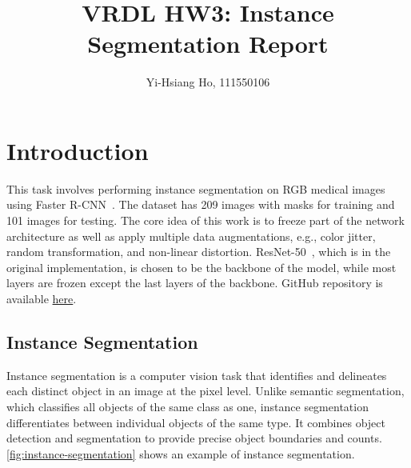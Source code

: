 \documentclass[10pt,twocolumn,letterpaper]{article}
\begin{document}
\title{VRDL HW3: Instance Segmentation Report}

\author{Yi-Hsiang Ho, 111550106
}
\maketitle



\section{Introduction}
\label{sec:intro}

This task involves performing instance segmentation on RGB medical images using
Faster R-CNN~\cite{MaskRCNN}. The dataset has 209 images with masks for training
and 101 images for testing. The core idea of this work is to freeze part of the
network architecture as well as apply multiple data augmentations, e.g., color
jitter, random transformation, and non-linear distortion. ResNet-50~\cite{ResNet},
which is in the original implementation, is chosen to be the backbone of the model,
while most layers are frozen except the last layers of the backbone. GitHub
repository is available
\href{https://github.com/Sean20405/NYCU-DLVR-HW3}{here}.

\subsection{Instance Segmentation}

Instance segmentation is a computer vision task that identifies and delineates each
distinct object in an image at the pixel level. Unlike semantic segmentation, which
classifies all objects of the same class as one, instance segmentation differentiates
between individual objects of the same type. It combines object detection and
segmentation to provide precise object boundaries and counts.
\cref{fig:instance-segmentation} shows an example of instance segmentation.
\end{document}
